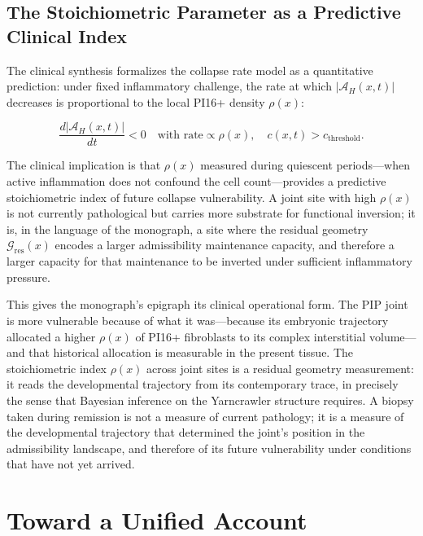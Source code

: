 \documentclass[12pt, a4paper]{article}
\theoremstyle{definition}
\begin{document}
\subsection{The Stoichiometric Parameter as a Predictive Clinical Index}

The clinical synthesis formalizes the collapse rate model as a quantitative prediction: under fixed inflammatory challenge, the rate at which $|\mathcal{A}_H(x,t)|$ decreases is proportional to the local PI16+ density $\rho(x)$:

\begin{equation}
\frac{d|\mathcal{A}_H(x,t)|}{dt} < 0 \quad \text{with rate} \propto \rho(x), \quad c(x,t) > c_{\mathrm{threshold}}.
\end{equation}

The clinical implication is that $\rho(x)$ measured during quiescent periods---when active inflammation does not confound the cell count---provides a predictive stoichiometric index of future collapse vulnerability. A joint site with high $\rho(x)$ is not currently pathological but carries more substrate for functional inversion; it is, in the language of the monograph, a site where the residual geometry $\mathcal{G}_{\mathrm{res}}(x)$ encodes a larger admissibility maintenance capacity, and therefore a larger capacity for that maintenance to be inverted under sufficient inflammatory pressure.

This gives the monograph's epigraph its clinical operational form. The PIP joint is more vulnerable because of what it was---because its embryonic trajectory allocated a higher $\rho(x)$ of PI16+ fibroblasts to its complex interstitial volume---and that historical allocation is measurable in the present tissue. The stoichiometric index $\rho(x)$ across joint sites is a residual geometry measurement: it reads the developmental trajectory from its contemporary trace, in precisely the sense that Bayesian inference on the Yarncrawler structure requires. A biopsy taken during remission is not a measure of current pathology; it is a measure of the developmental trajectory that determined the joint's position in the admissibility landscape, and therefore of its future vulnerability under conditions that have not yet arrived.

\section{Toward a Unified Account}
\end{document}
